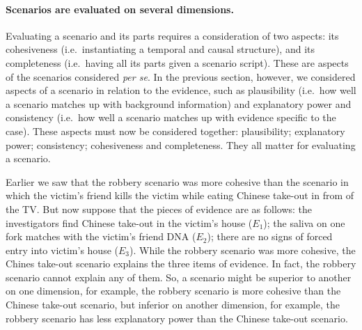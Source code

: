 \documentclass[10pt]{article}
\begin{document}
\paragraph{Scenarios are evaluated on several dimensions.} 

Evaluating a scenario and its parts requires a consideration of two aspects: its cohesiveness (i.e.\ instantiating a temporal and causal structure),
and its completeness (i.e.\ having all its parts given a scenario script). These are aspects of the scenarios considered \textit{per se}. In the previous section, however, 
we considered aspects of a scenario in relation to the evidence, such as plausibility (i.e.\ how well a scenario matches up with 
background information) and explanatory power and consistency (i.e.\ how well a scenario matches up with evidence specific to the case). 
These aspects must now be considered together: plausibility; explanatory power; consistency; 
cohesiveness and completeness. They all matter for evaluating a scenario. 

Earlier we saw that the robbery scenario was more cohesive than the scenario in which the victim's 
friend kills the victim while eating Chinese take-out in from of the TV. But now suppose that the pieces 
of evidence are as follows: the investigators find Chinese take-out in the victim's house ($E_1$); the saliva on one fork 
matches with the victim's friend DNA ($E_2$); there are no signs of forced entry into victim's house ($E_3$). While the robbery scenario was 
more cohesive, the Chines take-out scenario explains the three items of evidence. In fact, the robbery scenario cannot explain any of them. 
So, a scenario might be superior to another on one dimension, for example, the robbery scenario is 
more cohesive than the Chinese take-out scenario, but inferior on another dimension, for example, the robbery scenario 
has less explanatory power than the Chinese take-out scenario. 
\end{document}

